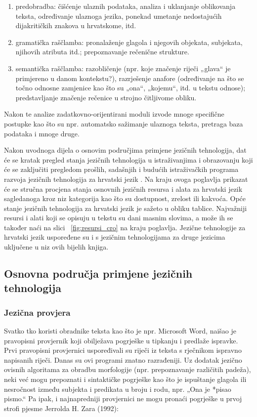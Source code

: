 \begin{multicols}{2}
\begin{enumerate}
\item predobradba: čišćenje ulaznih podataka, analiza i uklanjanje oblikovanja teksta, određivanje ulaznoga jezika, ponekad umetanje nedostajućih dijakritičkih znakova u hrvatskome, itd.
\item gramatička raščlamba: pronalaženje glagola i njegovih objekata, subjekata, njihovih atributa itd.; prepoznavanje rečenične strukture.
\item semantička raščlamba: razobličenje (npr. koje značenje riječi „glava“ je primjereno u danom kontekstu?), razrješenje anafore (određivanje na što se točno odnosne zamjenice kao što su „ona“, „kojemu“, itd. u tekstu odnose); predstavljanje značenje rečenice u strojno čitljivome obliku.
\end{enumerate}

Nakon te analize zadatkovno-orijentirani moduli izvode mnoge specifične postupke kao što su npr. automatsko sažimanje ulaznoga teksta, pretraga baza podataka i mnoge druge.

Nakon uvodnoga dijela o osnovim područjima primjene jezičnih tehnologija, dat će se kratak pregled stanja jezičnih tehnologija u istraživanjima i obrazovanju koji će se zaključiti pregledom prošlih, sadašnjih i budućih istraživačkih programa razvoja jezičnih tehnologija za hrvatski jezik \cite{boo5}. Na kraju ovoga poglavlja prikazat će se stručna procjena stanja osnovnih jezičnih resursa i alata za hrvatski jezik sagledanoga kroz niz kategorija kao što su dostupnost, zrelost ili kakvoća. Opće stanje jezičnih tehnologija za hrvatski jezik je sažeto u obliku tablice. Najvažniji resursi i alati koji se opisuju u tekstu su dani masnim slovima, a može ih se također naći na slici ~\ref{fig:resursi_cro} na kraju poglavlja. Jezične tehnologije za hrvatski jezik uspoređene su i s jezičnim tehnologijama za druge jezicima uključene u niz ovih bijelih knjiga.

\subsection{Osnovna područja primjene jezičnih tehnologija} 

\subsubsection{Jezična provjera}

Svatko tko koristi obradnike teksta kao što je npr. Microsoft Word, naišao je pravopisni provjernik koji obilježava pogrješke u tipkanju i predlaže ispravke. Prvi pravopisni provjernici uspoređivali su riječi iz teksta s rječnikom ispravno napisanih riječi. Danas su ovi programi znatno razrađeniji. Uz dodatak jezično ovisnih algoritama za obradbu morfologije (npr. prepoznavanje različitih padeža), neki već mogu prepoznati i sintaktičke pogrješke kao što je ispuštanje glagola ili nesročnost između subjekta i predikata u broju i rodu, npr. „Ona je *pisao pismo.“ Pa ipak, i najnapredniji provjernici ne mogu pronaći pogrješke u prvoj strofi pjesme Jerrolda H. Zara (1992):


\end{multicols}
